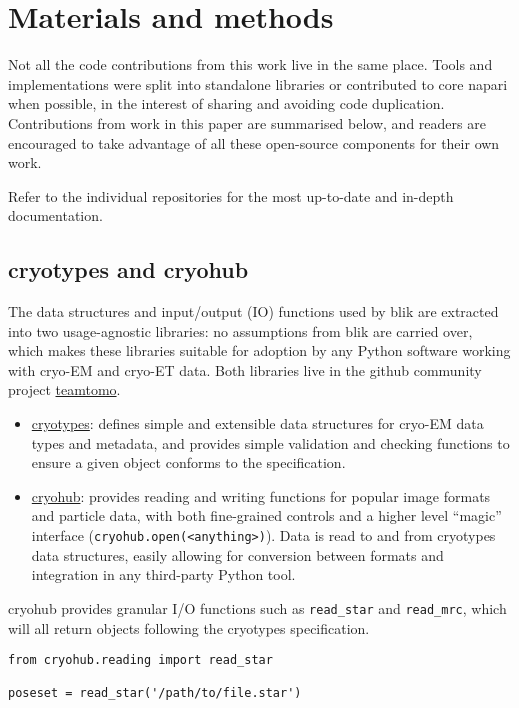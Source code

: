\section{Materials and methods}
Not all the code contributions from this work live in the same place. Tools and implementations were split into standalone libraries or contributed to core napari when possible, in the interest of sharing and avoiding code duplication. Contributions from work in this paper are summarised below, and readers are encouraged to take advantage of all these open-source components for their own work.

Refer to the individual repositories for the most up-to-date and in-depth documentation.

\subsection{cryotypes and cryohub}\label{cryotypes-and-cryohub}

The data structures and input/output (IO) functions used by blik are extracted into two usage-agnostic libraries: no assumptions from blik are carried over, which makes these libraries suitable for adoption by any Python software working with cryo-EM and cryo-ET data. Both libraries live in the github community project \href{https://github.com/teamtomo/}{teamtomo}.

\begin{itemize}[noitemsep] 
    \item \href{https://github.com/teamtomo/cryotypes/}{cryotypes}: defines simple and extensible data structures for cryo-EM data types and metadata, and provides simple validation and checking functions to ensure a given object conforms to the specification. 
    \item \href{https://github.com/teamtomo/cryohub/}{cryohub}: provides reading and writing functions for popular image formats and particle data, with both fine-grained controls and a higher level ``magic'' interface (\texttt{cryohub.open(\textless{}anything\textgreater{})}). Data is read to and from cryotypes data structures, easily allowing for conversion between formats and integration in any third-party Python tool.
\end{itemize}

cryohub provides granular I/O functions such as \texttt{read\_star} and \texttt{read\_mrc}, which will all return objects following the cryotypes specification.

\begin{verbatim}
from cryohub.reading import read_star

poseset = read_star('/path/to/file.star')
\end{verbatim}

